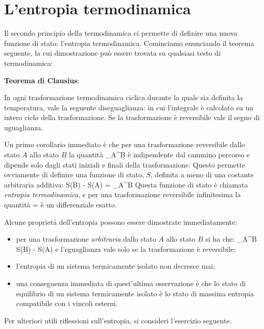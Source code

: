 \section{L'entropia termodinamica}
\label{sec1:entropia}

Il secondo principio della termodinamica ci permette di definire una nuova funzione di stato: l'entropia termodinamica. Cominciamo enunciando il teorema seguente, la cui dimostrazione può essere trovata su qualsiasi testo di termodinamica:

\textbf{Teorema di Clausius}:\par
In ogni trasformazione termodinamica ciclica durante la quale sia definita la temperatura, vale la seguente diseguaglianza:
\be
\label{eq:ointciclo}
\oint {} 
\ee
in cui l'integrale è calcolato su un intero ciclo della trasformazione. Se la trasformazione è reversibile vale il segno di uguaglianza.

Un primo corollario immediato è che per una trasformazione reversibile dallo stato $A$ allo stato $B$ la quantità
\be
\label{eq:intab}
\int_{A}^{B} 
\ee
è indipendente dal cammino percorso e dipende solo dagli stati iniziali e finali della trasformazione. Questo permette ovviamente di definire una funzione di stato, $S$, definita a meno di una costante arbitraria additiva:
\be
\label{eq:entropia-termodinamica}
S(B) - S(A) = \int_{A}^{B} 
\ee
Questa funzione di stato è chiamata {\em entropia termodinamica}, e per una trasformazione reversibile infinitesima la quantità
\be
\label{eq:dentropia}
 = 
\ee
è un differenziale esatto.

Alcune proprietà dell'entropia possono essere dimostrate immediatamente:
\begin{itemize}
	\item per una trasformazione {\em arbitraria} dallo stato $A$ allo stato $B$ si ha che:
	\be
	\label{eq:disentro}\int_{A}^{B}  \le S(B) - S(A)
	\ee
	e l'eguaglianza vale solo se la trasformazione è reversibile;
	\item l'entropia di un sistema termicamente isolato non decresce mai;
	\item una conseguenza immediata di quest'ultima osservazione è che lo stato di equilibrio di un sistema termicamente isolato è lo stato di massima entropia compatibile con i vincoli esterni.
\end{itemize}
Per ulteriori utili riflessioni sull'entropia, si consideri l'esercizio seguente.

